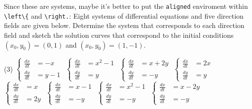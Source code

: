     \begin{Exercise}\label{EX22}
        Since these are systems, maybe it's better to put the \verb|aligned| enviroment within  \verb|\left\{| and \verb|\right.|: 
        \Question Eight systems of differential equations and five direction fields are given below.  Determine the system that corresponds to each direction field and sketch the solution curves that correspond to the initial conditions $(x_0, y_0) = (0,1)$ and $(x_0, y_0) = (1,-1)$.
        \begin{tasks}(3)
            \task $\left\{\begin{aligned}
            \frac{dx}{dt} & = -x \\     
            \frac{dy}{dt} & = y-1
            \end{aligned}\right.$
            \task $\left\{\begin{aligned}
            \frac{dx}{dt} & = x^2 - 1 \\        
            \frac{dy}{dt} & = y
            \end{aligned}\right.$
            \task $\left\{\begin{aligned}
            \frac{dx}{dt} & = x+2y \\
            \frac{dy}{dt} & = -y
            \end{aligned}\right.$
            \task $\left\{\begin{aligned}
            \frac{dx}{dt} & = 2x \\
            \frac{dy}{dt} & =  y
            \end{aligned}\right.$
            \task $\left\{\begin{aligned}
            \frac{dx}{dt} & = x \\
            \frac{dy}{dt}  & = 2y
            \end{aligned}\right.$ 
            \task$\left\{\begin{aligned}
            \frac{dx}{dt} & = x-1 \\
            \frac{dy}{dt} & = -y
            \end{aligned}\right.$
            \task $\left\{\begin{aligned}
            \frac{dx}{dt} & = x^2-1 \\
            \frac{dy}{dt} & = -y
            \end{aligned}\right.$        
            \task $\left\{\begin{aligned}
            \frac{dx}{dt} & = x- 2y \\
            \frac{dy}{dt} & =  -y
            \end{aligned}\right.$
        \end{tasks}
    \end{Exercise}
